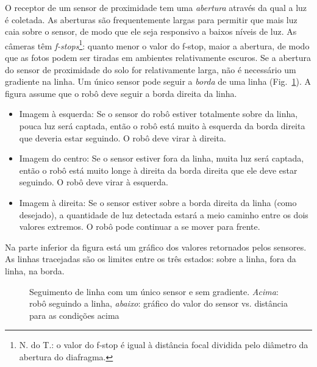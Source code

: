 O receptor de um sensor de proximidade tem uma \emph{abertura} através da qual a luz é coletada. As aberturas são frequentemente largas para permitir que mais luz caia sobre o sensor, de modo que ele seja responsivo a baixos níveis de luz. As câmeras têm \emph{f-stops}\footnote{N. do T.: o valor do f-stop é igual à distância focal dividida pelo diâmetro da abertura do diafragma.}: quanto menor o valor do f-stop, maior a abertura, de modo que as fotos podem ser tiradas em ambientes relativamente escuros. Se a abertura do sensor de proximidade do solo for relativamente larga, não é necessário um gradiente na linha. Um único sensor pode seguir a \emph{borda} de uma linha (Fig.~\ref{fig.no-gradient}). A figura assume que o robô deve seguir a borda direita da linha.
\begin{itemize}
\item Imagem à esquerda: Se o sensor do robô estiver totalmente sobre da linha, pouca luz será captada, então o robô está muito à esquerda da borda direita que deveria estar seguindo. O robô deve virar à direita.
\item Imagem do centro: Se o sensor estiver fora da linha, muita luz será captada, então o robô está muito longe à direita da borda direita que ele deve estar seguindo. O robô deve virar à esquerda.
\item Imagem à direita: Se o sensor estiver sobre a borda direita da linha (como desejado), a quantidade de luz detectada estará a meio caminho entre os dois valores extremos. O robô pode continuar a se mover para frente.
\end{itemize}
Na parte inferior da figura está um gráfico dos valores retornados pelos sensores. As linhas tracejadas são os limites entre os três estados: sobre a linha, fora da linha, na borda.

\begin{figure}
\begin{center}
\caption{Seguimento de linha com um único sensor e sem gradiente. \textit{Acima}: robô seguindo a linha, \textit{abaixo}: gráfico do valor do sensor vs. distância para as condições acima}\label{fig.no-gradient}
\end{center}
\end{figure}

